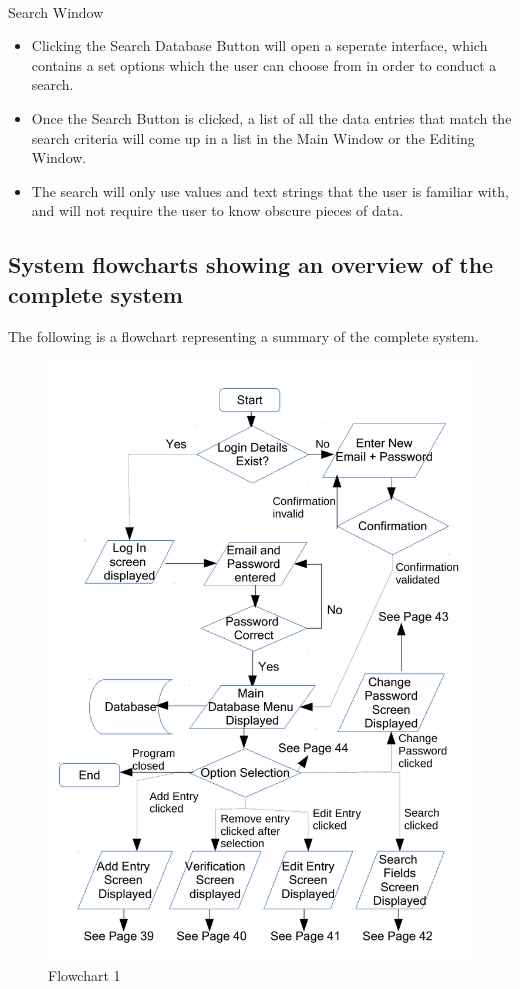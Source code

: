 \

Search Window
\begin{itemize}
    \item Clicking the Search Database Button will open a seperate interface, which contains a set options which the user can choose from in order to conduct a search.
    \item Once the Search Button is clicked, a list of all the data entries that match the search criteria will come up in a list in the Main Window or the Editing Window.
    \item The search will only use values and text strings that the user is familiar with, and will not require the user to know obscure pieces of data.
\end{itemize}

\subsection{System flowcharts showing an overview of the complete system}

The following is a flowchart representing a summary of the complete system.

\begin{figure}[H]
    \caption{Flowchart 1} \label{Flowchart_1.pdf}
    \includegraphics[width=\textwidth]{./Design/Flowcharts/Flowchart_1.pdf}
\end{figure}

